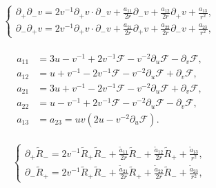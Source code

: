 \documentclass[10pt,a4paper]{amsart}
\begin{document}
\begin{equation} \label{partial partial v}
	\begin{aligned}
		\begin{split}
			\left\lbrace
			\begin{array}{lr}	
				\partial_{+} \partial_{-}v =2 v^{-1} \partial_{+}v \cdot \partial_{-} v + \frac{a_{11}}{2r} \partial_{-}v+ \frac{a_{12}}{2r}\partial_{+}v + \frac{a_{13}}{r^2}, \\
				\partial_{-} \partial_{+}v = 2 v^{-1} \partial_{+}v \cdot \partial_{-} v + \frac{a_{21}}{2r}\partial_{+}v+ \frac{a_{22}}{2r}\partial_{-}v + \frac{a_{23}}{r^2},
			\end{array}	
			\right.
		\end{split}	
	\end{aligned}
\end{equation}

\begin{equation} \label{coefficient a} 
	\begin{aligned}
		a_{11} & =3u-v^{-1}+2v^{-1} \mathcal{F}- v^{-2} \partial_{u} \mathcal{F} - \partial_{v} \mathcal{F}, \\
		a_{12} & =u+v^{-1}-2v^{-1} \mathcal{F}- v^{-2} \partial_{u} \mathcal{F} + \partial_{v} \mathcal{F}, \\
		a_{21} & =3u+v^{-1}-2v^{-1} \mathcal{F}- v^{-2} \partial_{u} \mathcal{F} + \partial_{v} \mathcal{F}, \\
		a_{22} & =u - v^{-1} + 2v^{-1} \mathcal{F}- v^{-2} \partial_{u} \mathcal{F} - \partial_{v} \mathcal{F}, \\
		a_{13}&  = a_{23} = uv(2u-v^{-2}\partial_{u} \mathcal{F}).
	\end{aligned}
\end{equation}	

\begin{equation} \label{eq of partial R}
	\begin{aligned}
		\begin{split}
			\left\lbrace
			\begin{array}{lr}	
				\partial_{+} \tilde{R}_{-} = 2 v^{-1}\tilde{R}_{+}\tilde{R}_{-} + \frac{\tilde{a}_{11}}{2r} \tilde{R}_{-}+ \frac{\tilde{a}_{12}}{2r}\tilde{R}_{+} + \frac{\tilde{a}_{13}}{r^2}, \\
				\partial_{-} \tilde{R}_{+} = 2 v^{-1}\tilde{R}_{+}\tilde{R}_{-} + \frac{\tilde{a}_{21}}{2r}\tilde{R}_{+}+ \frac{\tilde{a}_{22}}{2r}\tilde{R}_{-} + \frac{\tilde{a}_{23}}{r^2}, 
			\end{array}	
			\right.
		\end{split}	
	\end{aligned}
\end{equation}
\end{document}
